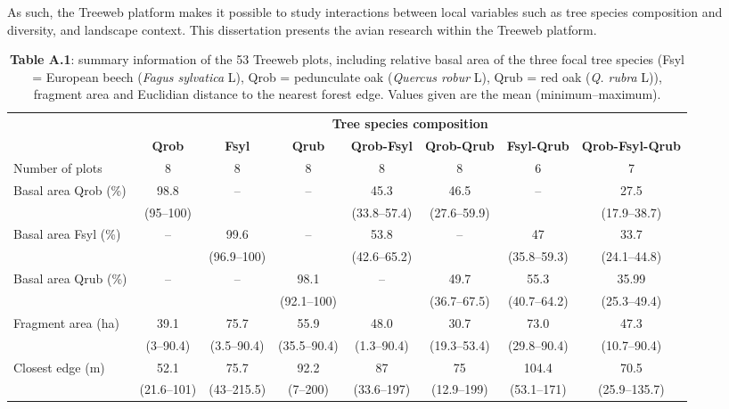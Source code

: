 \documentclass[10pt, twoside]{book} %
\begin{document}
As such, the Treeweb platform makes it possible to study interactions between local variables such as tree species composition and diversity, and landscape context. This dissertation presents the avian research within the Treeweb platform. 

	
	
\clearpage
\begin{landscape}
\begin{table}
	\begin{center}
		\begin{footnotesize}
			\caption*{\textbf{Table A.1}: summary information of the 53 Treeweb plots, including relative basal area of the three focal tree species (Fsyl = European beech (\textit{Fagus sylvatica} L), Qrob = pedunculate oak (\textit{Quercus robur} L), Qrub = red oak (\textit{Q. rubra} L)), fragment area and Euclidian distance to the nearest forest edge. Values given are the mean (minimum--maximum).}  \label{TabA1}
			
	\begingroup
	\setlength{\tabcolsep}{10pt} %
	\renewcommand{\arraystretch}{1.5} %
	\begin{tabular}{l c c c c c c c}
				
				\toprule
				& \multicolumn{7}{c}{\textbf{Tree species composition}} \\
				& \textbf{Qrob} & \textbf{Fsyl} & \textbf{Qrub} &  \textbf{Qrob-Fsyl} & \textbf{Qrob-Qrub} & \textbf{Fsyl-Qrub} & \textbf{Qrob-Fsyl-Qrub}\\
				\hline
				Number of plots & 8 & 8 & 8 & 8 & 8 & 6 & 7\\
				\cline{2-8}
				
				\multirow{2}{*}{Basal area Qrob (\%)} & 98.8 & -- & --& 45.3  & 46.5  & -- & 27.5 \\
				& (95--100) &&&(33.8--57.4) & (27.6--59.9) &&(17.9--38.7)\\
				\cline{2-8}
				
				\multirow{2}{*}{Basal area Fsyl (\%)} &  \multirow{2}{*}{--} & 99.6 & \multirow{2}{*}{--} & 53.8  & \multirow{2}{*}{--} & 47  & 33.7 \\
				&& (96.9--100) &&(42.6--65.2)&&(35.8--59.3)&(24.1--44.8)\\
				\cline{2-8}
				\multirow{2}{*}{Basal area Qrub (\%)} &  \multirow{2}{*}{--} & \multirow{2}{*}{--} & 98.1 & \multirow{2}{*}{--}  & 49.7 & 55.3  & 35.99 \\
				&&& (92.1--100) &&(36.7--67.5)&(40.7--64.2)&(25.3--49.4)\\
				\cline{2-8}
				\multirow{2}{*}{Fragment area (ha)} & 39.1 & 75.7 & 55.9 &48.0&30.7&73.0&47.3\\
				&(3--90.4)&	(3.5--90.4)&(35.5--90.4)&(1.3--90.4)&(19.3--53.4)&(29.8--90.4)&(10.7--90.4)\\
				\cline{2-8}
				\multirow{2}{*}{Closest edge (m)}& 52.1 & 75.7 & 92.2 & 87 & 75 & 104.4 & 70.5\\
				&(21.6--101)	& (43--215.5) & (7--200)	&	(33.6--197) & (12.9--199) & (53.1--171) & (25.9--135.7)\\
				\bottomrule
				

\end{tabular}
\end{footnotesize}
\end{center}
\end{table}
\end{landscape}
\end{document}
